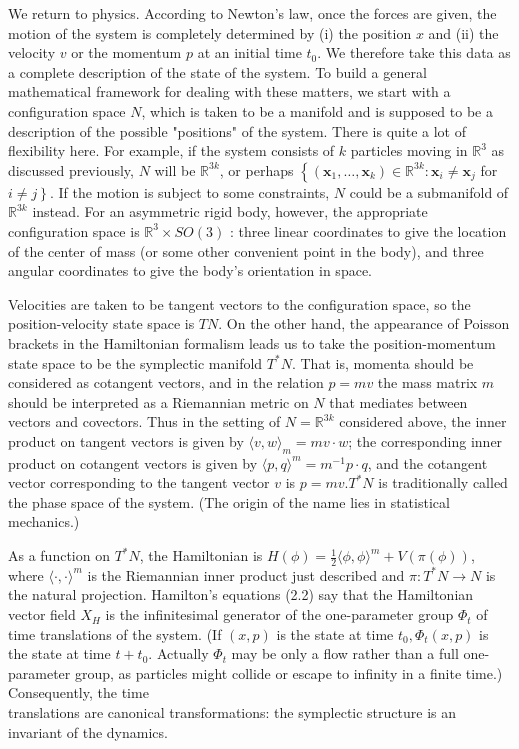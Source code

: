 \documentclass[10pt, letterpaper]{article}
\begin{document}
We return to physics. According to Newton's law, once the forces are given, the motion of the system is completely determined by (i) the position $x$ and (ii) the velocity $v$ or the momentum $p$ at an initial time $t_{0}$. We therefore take this data as a complete description of the state of the system. To build a general mathematical framework for dealing with these matters, we start with a configuration space $N$, which is taken to be a manifold and is supposed to be a description of the possible "positions" of the system. There is quite a lot of flexibility here. For example, if the system consists of $k$ particles moving in $\mathbb{R}^{3}$ as discussed previously, $N$ will be $\mathbb{R}^{3 k}$, or perhaps $\left\{\left(\mathbf{x}_{1}, \ldots, \mathbf{x}_{k}\right) \in \mathbb{R}^{3 k}: \mathbf{x}_{i} \neq \mathbf{x}_{j}\right.$ for $\left.i \neq j\right\}$. If the motion is subject to some constraints, $N$ could be a submanifold of $\mathbb{R}^{3 k}$ instead. For an asymmetric rigid body, however, the appropriate configuration space is $\mathbb{R}^{3} \times S O(3)$ : three linear coordinates to give the location of the center of mass (or some other convenient point in the body), and three angular coordinates to give the body's orientation in space.

Velocities are taken to be tangent vectors to the configuration space, so the position-velocity state space is $T N$. On the other hand, the appearance of Poisson brackets in the Hamiltonian formalism leads us to take the position-momentum state space to be the symplectic manifold $T^{*} N$. That is, momenta should be considered as cotangent vectors, and in the relation $p=m v$ the mass matrix $m$ should be interpreted as a Riemannian metric on $N$ that mediates between vectors and covectors. Thus in the setting of $N=\mathbb{R}^{3 k}$ considered above, the inner product on tangent vectors is given by $\langle v, w\rangle_{m}=m v \cdot w$; the corresponding inner product on cotangent vectors is given by $\langle p, q\rangle^{m}=m^{-1} p \cdot q$, and the cotangent vector corresponding to the tangent vector $v$ is $p=m v . T^{*} N$ is traditionally called the phase space of the system. (The origin of the name lies in statistical mechanics.)

As a function on $T^{*} N$, the Hamiltonian is $H(\phi)=\frac{1}{2}\langle\phi, \phi\rangle^{m}+V(\pi(\phi))$, where $\langle\cdot, \cdot\rangle^{m}$ is the Riemannian inner product just described and $\pi: T^{*} N \rightarrow N$ is the natural projection. Hamilton's equations (2.2) say that the Hamiltonian vector field $X_{H}$ is the infinitesimal generator of the one-parameter group $\Phi_{t}$ of time translations of the system. (If $(x, p)$ is the state at time $t_{0}, \Phi_{t}(x, p)$ is the state at time $t+t_{0}$. Actually $\Phi_{t}$ may be only a flow rather than a full one-parameter group, as particles might collide or escape to infinity in a finite time.) Consequently, the time\\
translations are canonical transformations: the symplectic structure is an invariant of the dynamics.
\end{document}

